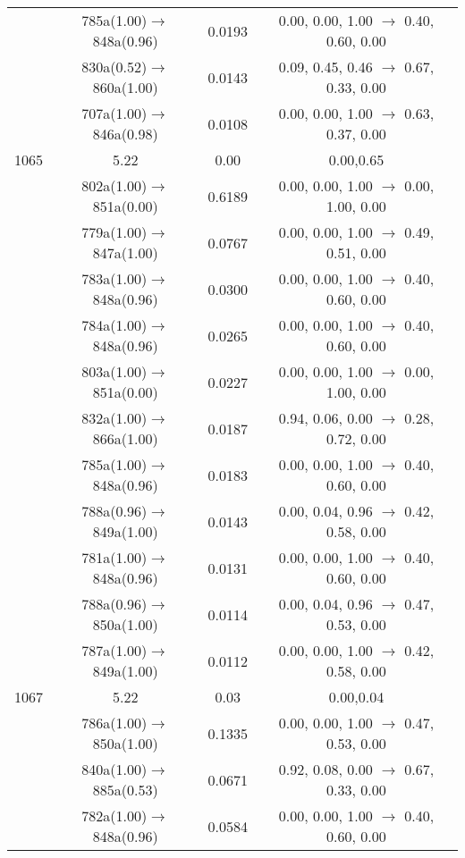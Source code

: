 \documentclass[10pt,a4paper]{article}
\begin{document}
\begin{longtable}{c|c|c|c}
 	& 785a(1.00)$\rightarrow$848a(0.96) &	 0.0193 &	 0.00, 0.00, 1.00 $\rightarrow$ 0.40, 0.60, 0.00 \\ 
 	& 830a(0.52)$\rightarrow$860a(1.00) &	 0.0143 &	 0.09, 0.45, 0.46 $\rightarrow$ 0.67, 0.33, 0.00 \\ 
 	& 707a(1.00)$\rightarrow$846a(0.98) &	 0.0108 &	 0.00, 0.00, 1.00 $\rightarrow$ 0.63, 0.37, 0.00 \\ 
 \hline1065 &	 5.22 &	 0.00 &	 0.00,0.65 \\ 
  	& 802a(1.00)$\rightarrow$851a(0.00) &	 0.6189 &	 0.00, 0.00, 1.00 $\rightarrow$ 0.00, 1.00, 0.00 \\ 
 	& 779a(1.00)$\rightarrow$847a(1.00) &	 0.0767 &	 0.00, 0.00, 1.00 $\rightarrow$ 0.49, 0.51, 0.00 \\ 
 	& 783a(1.00)$\rightarrow$848a(0.96) &	 0.0300 &	 0.00, 0.00, 1.00 $\rightarrow$ 0.40, 0.60, 0.00 \\ 
 	& 784a(1.00)$\rightarrow$848a(0.96) &	 0.0265 &	 0.00, 0.00, 1.00 $\rightarrow$ 0.40, 0.60, 0.00 \\ 
 	& 803a(1.00)$\rightarrow$851a(0.00) &	 0.0227 &	 0.00, 0.00, 1.00 $\rightarrow$ 0.00, 1.00, 0.00 \\ 
 	& 832a(1.00)$\rightarrow$866a(1.00) &	 0.0187 &	 0.94, 0.06, 0.00 $\rightarrow$ 0.28, 0.72, 0.00 \\ 
 	& 785a(1.00)$\rightarrow$848a(0.96) &	 0.0183 &	 0.00, 0.00, 1.00 $\rightarrow$ 0.40, 0.60, 0.00 \\ 
 	& 788a(0.96)$\rightarrow$849a(1.00) &	 0.0143 &	 0.00, 0.04, 0.96 $\rightarrow$ 0.42, 0.58, 0.00 \\ 
 	& 781a(1.00)$\rightarrow$848a(0.96) &	 0.0131 &	 0.00, 0.00, 1.00 $\rightarrow$ 0.40, 0.60, 0.00 \\ 
 	& 788a(0.96)$\rightarrow$850a(1.00) &	 0.0114 &	 0.00, 0.04, 0.96 $\rightarrow$ 0.47, 0.53, 0.00 \\ 
 	& 787a(1.00)$\rightarrow$849a(1.00) &	 0.0112 &	 0.00, 0.00, 1.00 $\rightarrow$ 0.42, 0.58, 0.00 \\ 
 \hline1067 &	 5.22 &	 0.03 &	 0.00,0.04 \\ 
  	& 786a(1.00)$\rightarrow$850a(1.00) &	 0.1335 &	 0.00, 0.00, 1.00 $\rightarrow$ 0.47, 0.53, 0.00 \\ 
 	& 840a(1.00)$\rightarrow$885a(0.53) &	 0.0671 &	 0.92, 0.08, 0.00 $\rightarrow$ 0.67, 0.33, 0.00 \\ 
 	& 782a(1.00)$\rightarrow$848a(0.96) &	 0.0584 &	 0.00, 0.00, 1.00 $\rightarrow$ 0.40, 0.60, 0.00 \\ 

\end{longtable}
\end{document}
